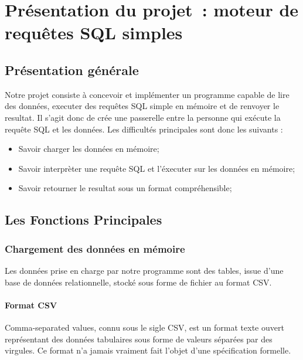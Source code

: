 \documentclass[oneside,13pt,a4paper]{report}
\begin{document}
\chapter{Présentation du projet : moteur de requêtes SQL simples}

\section{Présentation générale}

Notre projet consiste à concevoir et implémenter un programme capable de lire des données, executer des requêtes SQL simple en mémoire et de renvoyer le resultat.
Il s’agit donc de crée une passerelle entre la personne qui exécute la requête SQL et les données.
Les difficultés principales sont donc les suivants :
\vspace{0.3cm}
\begin{itemize}
	\item Savoir charger les données en mémoire;
	\item Savoir interprèter une requête SQL et l'éxecuter sur les données en mémoire;
	\item Savoir retourner le resultat sous un format compréhensible;
\end{itemize}
\vspace{0.3cm}

\section{Les Fonctions Principales}

\subsection{Chargement des données en mémoire}

Les données prise en charge par notre programme sont des tables, issue d'une base de données relationnelle, stocké sous forme de fichier au format CSV.

\subsubsection{Format CSV}
\label{csv}
Comma-separated values, connu sous le sigle CSV, est un format texte ouvert %
représentant des données tabulaires sous forme de valeurs séparées par des virgules.
Ce format n'a jamais vraiment fait l'objet d'une spécification formelle.
\end{document}
